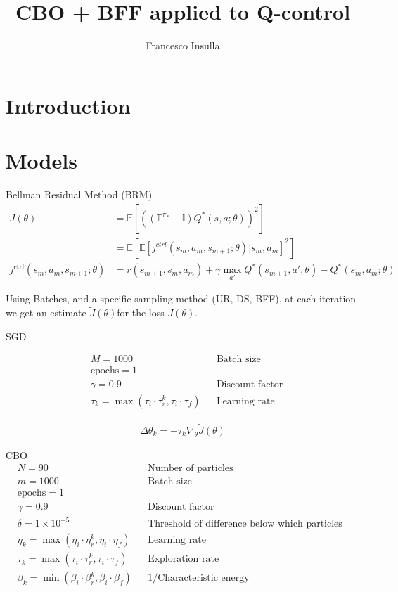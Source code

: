 \documentclass[11pt]{article}
\title{CBO + BFF applied to Q-control}
\author{Francesco Insulla}
\begin{document}
\maketitle

\section{Introduction}

\section{Models}

Bellman Residual Method (BRM)
\begin{align*}
    J(\theta) &= \mathbb E[((\mathbb T^{\pi_*}-\mathbb I) Q^*(s,a;\theta))^2]\\
&= \mathbb E[\mathbb E[j^{ctrl}(s_m, a_m, s_{m+1};\theta)|s_m,a_m]^2]\\
j^{\text{ctrl}}(s_m, a_m, s_{m+1};\theta) &= r(s_{m+1}, s_m, a_m)  + \gamma \max_{a'} Q^*(s_{m+1},a';\theta) - Q^*(s_m,a_m;\theta)
\end{align*}

Using Batches, and a specific sampling method (UR, DS, BFF), at each
iteration we get an estimate $\tilde J(\theta) $for the loss
$J(\theta)$.

SGD

\begin{align*}
    &M = 1000 && \text{Batch size}\\
    &\text{epochs} = 1 &&\\
    &\gamma = 0.9 && \text{Discount factor}\\
    &\tau_k = \max(\tau_i\cdot \tau_r^k, \tau_i\cdot\tau_f) && \text{Learning rate}
\end{align*}

\begin{align*}
    \Delta\theta_k = -\tau_k \nabla_\theta \tilde J(\theta)
\end{align*}


CBO
\begin{align*}
&N = 90 && \text{Number of particles}\\
&m = 1000 && \text{Batch size}\\
&\text{epochs} = 1 \\
&\gamma = 0.9 && \text{Discount factor}\\
&\delta = 1\times 10^{-5} && \text{Threshold of difference below which particles take a brownian motion step}\\
&\eta_k = \max(\eta_i\cdot \eta_r^k,\eta_i\cdot \eta_f) && \text{Learning rate}\\
&\tau_k =  \max(\tau_i\cdot \tau_r^k,\tau_i\cdot\tau_f) && \text{Exploration rate}\\
&\beta_k =  \min(\beta_i\cdot \beta_r^k,\beta_i\cdot \beta_f) && \text{1/Characteristic energy}
\end{align*}
\end{document}
